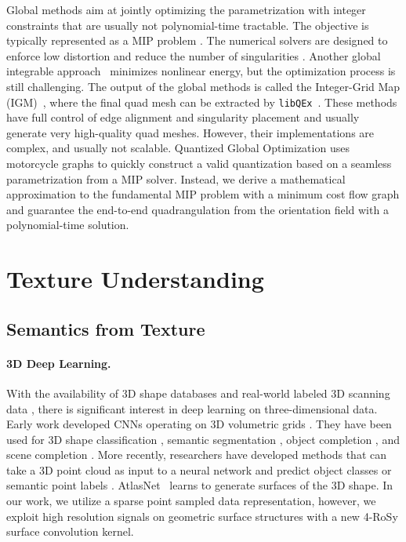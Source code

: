 Global methods aim at jointly optimizing the parametrization with integer constraints that are usually not polynomial-time tractable. The objective is typically represented as a MIP problem \cite{bommes2009mixed}. The numerical solvers are designed to enforce low distortion and reduce the number of singularities \cite{bommes2013integer,myles2013controlled,levi2014strict,myles2014robust}. Another global integrable approach~\cite{diamanti2015integrable} minimizes nonlinear energy, but the optimization process is still challenging. The output of the global methods is called the Integer-Grid Map (IGM)~\cite{bommes2013integer}, where the final quad mesh can be extracted by \texttt{libQEx}~\cite{ebke2013qex}. These methods have full control of edge alignment and singularity placement and usually generate very high-quality quad meshes. However, their implementations are complex, and usually not scalable. Quantized Global Optimization \cite{Campen2015QGP} uses motorcycle graphs to quickly construct a valid quantization based on a seamless parametrization from a MIP solver. Instead, we derive a mathematical approximation to the fundamental MIP problem with a minimum cost flow graph and guarantee the end-to-end quadrangulation from the orientation field with a polynomial-time solution.

\section{Texture Understanding}
\subsection{Semantics from Texture}
\label{related:texturenet}
\paragraph*{3D Deep Learning.}
With the availability of 3D shape databases \cite{wu20153d,chang2015shapenet,song2017semantic} and real-world labeled 3D scanning data \cite{song2015sun,armeni2017joint,dai2017scannet,chang2017matterport3d}, there is significant interest in deep learning on three-dimensional data.   Early work developed CNNs operating on 3D volumetric grids \cite{wu20153d,maturana2015voxnet}.  They have been used for 3D shape classification  \cite{qi2016volumetric,riegler2017octnet}, semantic  segmentation \cite{dai2017scannet,dai2018scancomplete}, object completion \cite{dai2017shape}, and scene completion \cite{dai2018scancomplete}.   More recently, researchers have developed methods that can take a 3D point cloud as input to a neural network and predict object classes or semantic point labels \cite{qi2017pointnet,qi2017pointnet++,tatarchenko2018tangent,su2018splatnet,atzmon2018point}.  AtlasNet~\cite{groueix2018papier} learns to generate surfaces of the 3D shape.  In our work, we utilize a sparse point sampled data representation, however, we exploit high resolution signals on geometric surface structures with a new 4-RoSy surface convolution kernel.

